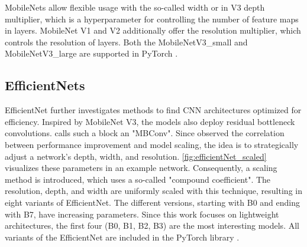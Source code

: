 MobileNets allow flexible usage with the so-called width or in V3 depth multiplier, which is a hyperparameter for controlling the number of feature maps in layers.
MobileNet V1 and V2 additionally offer the resolution multiplier, which controls the resolution of layers.
Both the MobileNetV3\_small and MobileNetV3\_large are supported in PyTorch \cite{pytorchmobilenetv3}.
\clearpage
\subsection{EfficientNets}

EfficientNet \cite{EfficientNet} further investigates methods to find \ac{CNN} architectures optimized for efficiency.
Inspired by MobileNet V3, the models also deploy residual bottleneck convolutions.
\cite{EfficientNet} calls such a block an "MBConv".
Since \cite{EfficientNet} observed the correlation between performance improvement and model scaling, the idea is to strategically adjust a network's depth, width, and resolution.
\autoref{fig:efficientNet_scaled} visualizes these parameters in an example network.
Consequently, a scaling method is introduced, which uses a so-called "compound coefficient".
The resolution, depth, and width are uniformly scaled with this technique, resulting in eight variants of EfficientNet.
The different versions, starting with B0 and ending with B7, have increasing parameters.
Since this work focuses on lightweight architectures, the first four (B0, B1, B2, B3) are the most interesting models.
All variants of the EfficientNet are included in the PyTorch library \cite{pytorchefficientNets}.


